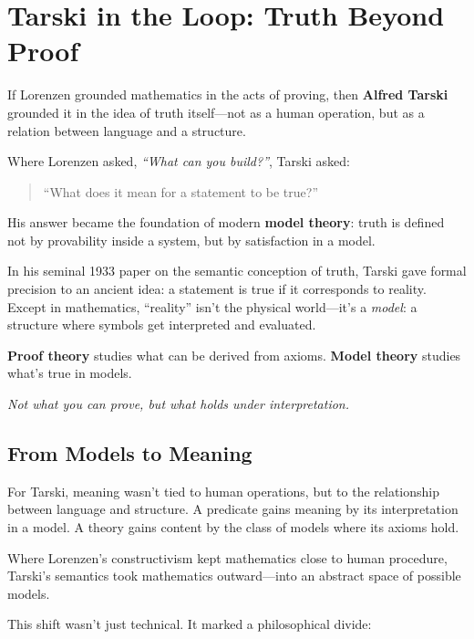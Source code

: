 \section{Tarski in the Loop: Truth Beyond Proof}

If Lorenzen grounded mathematics in the acts of proving, then \textbf{Alfred Tarski} grounded it in the idea of truth itself—not as a human operation, but as a relation between language and a structure.

Where Lorenzen asked, \emph{“What can you build?”}, Tarski asked:

\begin{quote}
    “What does it mean for a statement to be true?”
\end{quote}

His answer became the foundation of modern \textbf{model theory}:  
truth is defined not by provability inside a system, but by satisfaction in a model.

In his seminal 1933 paper on the semantic conception of truth, Tarski gave formal precision to an ancient idea: a statement is true if it corresponds to reality. Except in mathematics, “reality” isn’t the physical world—it’s a \emph{model}: a structure where symbols get interpreted and evaluated.

\textbf{Proof theory} studies what can be derived from axioms.  
\textbf{Model theory} studies what’s true in models.

\begin{center}
    \textit{Not what you can prove, but what holds under interpretation.}
\end{center}

\vspace{1em}

\subsection{From Models to Meaning}

For Tarski, meaning wasn’t tied to human operations, but to the relationship between language and structure. A predicate gains meaning by its interpretation in a model. A theory gains content by the class of models where its axioms hold.

Where Lorenzen’s constructivism kept mathematics close to human procedure, Tarski’s semantics took mathematics outward—into an abstract space of possible models.

This shift wasn’t just technical. It marked a philosophical divide:

